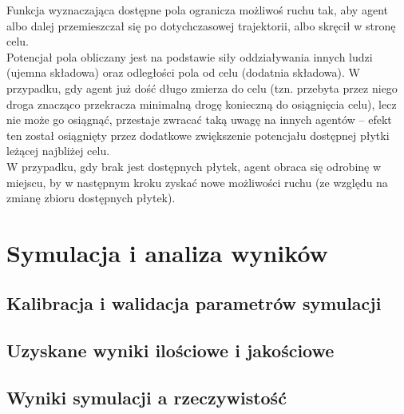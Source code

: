 \documentclass[a4paper, 12pt]{article}
\begin{document}
\indent Funkcja wyznaczająca dostępne pola ogranicza możliwoś ruchu tak, aby agent albo dalej przemieszczał się po dotychczasowej trajektorii, albo skręcił w stronę celu. \\
\indent Potencjał pola obliczany jest na podstawie siły oddziaływania innych ludzi (ujemna składowa) oraz odległości pola od celu (dodatnia składowa). W przypadku, gdy agent już dość długo zmierza do celu (tzn. przebyta przez niego droga znacząco przekracza minimalną drogę konieczną do osiągnięcia celu), lecz nie może go osiągnąć, przestaje zwracać taką uwagę na innych agentów – efekt ten został osiągnięty przez dodatkowe zwiększenie potencjału dostępnej płytki leżącej najbliżej celu. \\
\indent W przypadku, gdy brak jest dostępnych płytek, agent obraca się odrobinę w miejscu, by w następnym kroku zyskać nowe możliwości ruchu (ze względu na zmianę zbioru dostępnych płytek).

\newpage
    \section{Symulacja i analiza wyników}
    \label{sec:sim}


        \subsection{Kalibracja i walidacja parametrów symulacji}
        \label{sec:p}


        \subsection{Uzyskane wyniki ilościowe i jakościowe}
        \label{sec:results}


        \subsection{Wyniki symulacji a rzeczywistość}
        \label{sec:sim-vs-reality}
\end{document}
